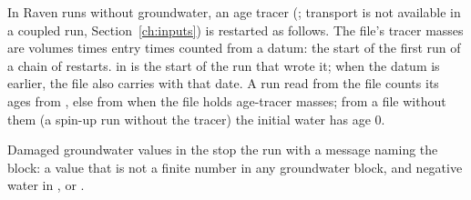 In Raven runs without groundwater, an age tracer (; transport is not available in a coupled run,
Section~\ref{ch:inputs}) is restarted as follows. The file's tracer masses are volumes times entry times counted from a
datum: the start of the first run of a chain of restarts.  in  is the start of the run that
wrote it; when the datum is earlier, the file also carries  with that date. A run read from the file
counts its ages from , else from  when the file holds age-tracer masses; from a file
without them (a spin-up run without the tracer) the initial water has age 0.

Damaged groundwater values in the  stop the run with a message naming the block: a value that is not a finite
number in any groundwater block, and negative water in ,  or
.

